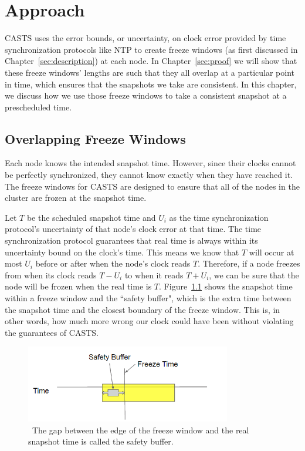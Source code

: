 \chapter{Approach}
\label{sec:approach}

CASTS uses the error bounds, or uncertainty, on clock
error provided by time synchronization protocols like NTP to create
freeze windows (as first discussed in Chapter~\ref{sec:description})
at each node. In Chapter~\ref{sec:proof} we will show that these freeze
windows' lengths are such that they all overlap at a particular point
in time, which ensures that the snapshots we take are consistent. In
this chapter, we discuss how we use those freeze windows to take a
consistent snapshot at a prescheduled time.

\section{Overlapping Freeze Windows}
\label{sec:overlapping}

Each node knows the intended snapshot time. However, since their
clocks cannot be perfectly synchronized, they cannot know exactly when
they have reached it. The freeze windows for CASTS are
designed to ensure that all of the nodes in the cluster are frozen at
the snapshot time.

Let $T$ be the scheduled snapshot time and $U_i$ as the time
synchronization protocol's uncertainty of that node's clock error at
that time. The time synchronization protocol guarantees that real time
is always within its uncertainty bound on the clock's time. This means
we know that $T$ will occur at most $U_i$ before or after when the
node's clock reads $T$. Therefore, if a node freezes from when its
clock reads $T - U_i$ to when it reads $T + U_i$, we can be sure that
the node will be frozen when the real time is $T$.
Figure~\ref{fig:safety-buff} shows the snapshot time within a freeze
window and the ``safety buffer", which is the extra time between the
snapshot time and the closest boundary of the freeze window. This is,
in other words, how much more wrong our clock could have been without
violating the guarantees of CASTS.

\begin{figure}
\centering
\caption{~The gap between the edge of the freeze window and the real snapshot time is called the safety buffer.}
\label{fig:safety-buff}
\includegraphics[width=0.8\textwidth]{safety-diagram.png}
\end{figure}


